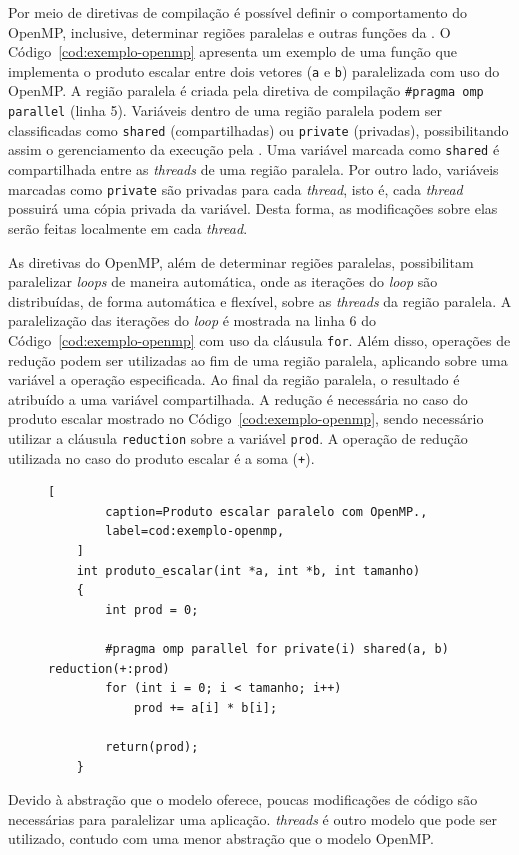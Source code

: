 Por meio de diretivas de compilação é possível definir o comportamento do
OpenMP, inclusive, determinar regiões paralelas e outras funções da \api.
O Código~\ref{cod:exemplo-openmp} apresenta um exemplo de uma função
que implementa o produto escalar entre dois vetores (\texttt{a} e \texttt{b}) paralelizada
com uso do OpenMP. A região paralela é criada pela diretiva de compilação
\texttt{\#pragma omp parallel} (linha 5). Variáveis dentro de uma região paralela
podem ser classificadas como \texttt{shared} (compartilhadas) ou \texttt{private} (privadas),
possibilitando assim o gerenciamento da execução pela \api. Uma variável marcada como \texttt{shared}
é compartilhada entre as \textit{threads} de uma região paralela. Por outro lado, variáveis marcadas
como \texttt{private} são privadas para cada \textit{thread}, isto é, cada \textit{thread} possuirá uma
cópia privada da variável. Desta forma, as modificações sobre elas serão feitas localmente em cada
\textit{thread}.

As diretivas do OpenMP, além de determinar regiões paralelas, possibilitam
paralelizar \textit{loops} de maneira automática, onde as iterações
do \textit{loop} são distribuídas, de forma automática e flexível, sobre as
\textit{threads} da região paralela. A paralelização das iterações do \textit{loop} é mostrada na linha 6 do
Código~\ref{cod:exemplo-openmp} com uso da cláusula \texttt{for}. Além disso, operações de redução podem ser
utilizadas ao fim de uma região paralela, aplicando sobre uma variável a
operação especificada. Ao final da região paralela, o resultado é atribuído a uma variável compartilhada. A redução
é necessária no caso do produto escalar mostrado no Código~\ref{cod:exemplo-openmp}, sendo necessário
utilizar a cláusula \texttt{reduction} sobre a variável \texttt{prod}. A operação de redução utilizada no caso do produto
escalar é a soma (\texttt{+}).

\begin{figure}[t]
	\begin{lstlisting}[
		caption=Produto escalar paralelo com OpenMP.,
		label=cod:exemplo-openmp,
	]
	int produto_escalar(int *a, int *b, int tamanho)
	{
		int prod = 0;

		#pragma omp parallel for private(i) shared(a, b) reduction(+:prod)
		for (int i = 0; i < tamanho; i++)
			prod += a[i] * b[i];

		return(prod);
	}
	\end{lstlisting}
\end{figure}

Devido à abstração que o modelo oferece, poucas modificações de código são
necessárias para paralelizar uma aplicação. \posix \textit{threads} é outro
modelo que pode ser utilizado, contudo com uma menor abstração que o modelo
OpenMP.

